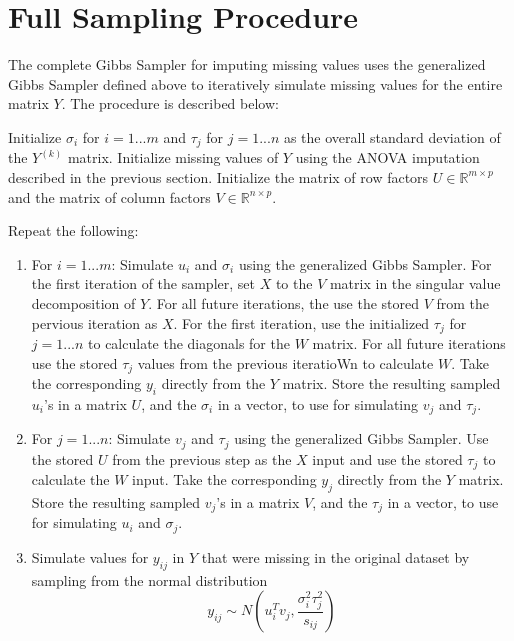 \documentclass[12pt,twoside]{dukestatscithesis}
\theoremstyle{definition}
\theoremstyle{definition}
\theoremstyle{definition}
\theoremstyle{remark}
\begin{document}
\section{Full Sampling Procedure}\label{full-sampling-procedure}

The complete Gibbs Sampler for imputing missing values uses the
generalized Gibbs Sampler defined above to iteratively simulate missing
values for the entire matrix \(Y\). The procedure is described below:

Initialize \(\sigma_i\) for \(i = 1 ... m\) and \(\tau_j\) for
\(j = 1 ... n\) as the overall standard deviation of the \(Y^{(k)}\)
matrix. Initialize missing values of \(Y\) using the ANOVA imputation
described in the previous section. Initialize the matrix of row factors
\(U \in \mathbb{R}^{m \times p}\) and the matrix of column factors
\(V \in \mathbb{R}^{n \times p}\).

Repeat the following:
\begin{enumerate}
\def\labelenumi{\arabic{enumi}.}
\item
  For \(i = 1 ... m\): Simulate \(u_i\) and \(\sigma_i\) using the
  generalized Gibbs Sampler. For the first iteration of the sampler, set
  \(X\) to the \(V\) matrix in the singular value decomposition of
  \(Y\). For all future iterations, the use the stored \(V\) from the
  pervious iteration as \(X\). For the first iteration, use the
  initialized \(\tau_j\) for \(j = 1 ... n\) to calculate the diagonals
  for the \(W\) matrix. For all future iterations use the stored
  \(\tau_j\) values from the previous iteratioWn to calculate \(W\).
  Take the corresponding \(y_i\) directly from the \(Y\) matrix. Store
  the resulting sampled \(u_i\)'s in a matrix \(U\), and the
  \(\sigma_i\) in a vector, to use for simulating \(v_j\) and
  \(\tau_j\).
\item
  For \(j = 1 ... n\): Simulate \(v_j\) and \(\tau_j\) using the
  generalized Gibbs Sampler. Use the stored \(U\) from the previous step
  as the \(X\) input and use the stored \(\tau_j\) to calculate the
  \(W\) input. Take the corresponding \(y_j\) directly from the \(Y\)
  matrix. Store the resulting sampled \(v_j\)'s in a matrix \(V\), and
  the \(\tau_j\) in a vector, to use for simulating \(u_i\) and
  \(\sigma_j\).
\item
  Simulate values for \(y_{ij}\) in \(Y\) that were missing in the
  original dataset by sampling from the normal distribution
  \[y_{ij} \sim N(u_i^Tv_j, \frac{\sigma_i^2\tau_j^2}{s_{ij}})\]
\end{enumerate}
\end{document}
